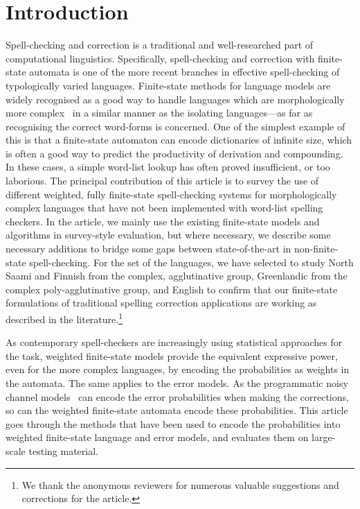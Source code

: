 \documentclass[a4paper,12pt]{article}
\begin{document}
\makeatletter\let\chapter\@undefined\makeatother
\listoftodos

\section{Introduction}

Spell-checking and correction is a traditional and well-researched part of
computational linguistics. Specifically, spell-checking and correction with
finite-state automata is one of the more recent branches in effective
spell-checking of typologically varied languages. Finite-state methods for
language models are widely recognised as a good way to handle languages which
are morphologically more complex~\cite[]{beesley2003finite} in a similar manner
as the isolating languages---as far as recognising the correct word-forms is
concerned. One of the simplest example of this is that a finite-state automaton
can encode dictionaries of infinite size, which is often a good way to predict
the productivity of derivation and compounding. In these cases, a simple
word-list lookup has often proved insufficient, or too laborious. The principal
contribution of this article is to survey the use of different weighted, fully
finite-state spell-checking systems for morphologically complex languages that
have not been implemented with word-list spelling checkers. In the article, we
mainly use the existing finite-state models and algorithms in survey-style
evaluation, but where necessary, we describe some necessary additions to bridge
some gaps between state-of-the-art in non-finite-state spell-checking. For the
set of the languages, we have selected to study North Saami and Finnish from
the complex, agglutinative group, Greenlandic from the complex
poly-agglutinative group, and English to confirm that our finite-state
formulations of traditional spelling correction applications are working as
described in the literature.\footnote{We thank the anonymous reviewers for
    numerous valuable suggestions and corrections for the article.}

As contemporary spell-checkers are increasingly using statistical
approaches for the task, weighted finite-state models provide the equivalent
expressive power, even for the more complex languages, by encoding the
probabilities as weights in the automata. The same applies to the error
models. As the programmatic noisy channel models~\cite[]{brill2000improved} can
encode the error probabilities when making the corrections, so can the weighted
finite-state automata encode these probabilities. This article goes through the
methods that have been used to encode the probabilities into weighted
finite-state language and error models, and evaluates them on large-scale
testing material.
\end{document}
